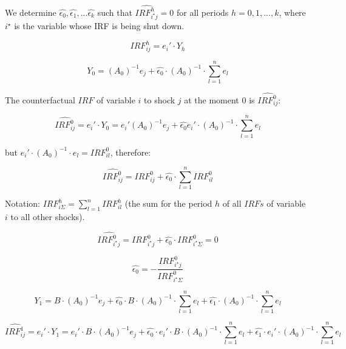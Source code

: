 \documentclass[11pt]{article}
\begin{document}
\begin{appendices}
We determine $\hat{\epsilon_0}, \hat{\epsilon_1}, ... \hat{\epsilon_k}$ such that $\hat{IRF^h_{i^\star j}} = 0$ for all periods $h=0,1,...,k$, where $i^\star$ is the variable whose IRF is being shut down.

\begin{equation}
IRF^h_{ij} = e_i' \cdot Y_h
\end{equation}

\begin{equation}
Y_{0}=(A_0)^{-1} e_j + \hat{\epsilon_0} \cdot (A_0)^{-1}\cdot \sum_{l=1}^n e_l
\end{equation}

The counterfactual $IRF$ of variable $i$ to shock $j$ at the moment 0 is $\hat{IRF^0_{ij}}$:

\begin{equation}
\hat{IRF^0_{ij}} = e_i' \cdot Y_{0}=  e_i' (A_0)^{-1} e_j + \hat{\epsilon_0} e_i' \cdot (A_0)^{-1}\cdot \sum_{l=1}^n e_l
\end{equation}

but $e_i' \cdot (A_0)^{-1}\cdot e_l = IRF^0_{il}$, therefore: 

\begin{equation}
\hat{IRF^0_{ij}} = IRF^0_{ij} + \hat{\epsilon_0} \cdot \sum_{l=1}^n IRF^0_{il}
\end{equation}

Notation: $IRF^h_{i\Sigma} = \sum_{l=1}^n IRF^h_{il} $ (the sum for the period $h$ of all $IRFs$ of variable $i$ to all other shocks).

\begin{equation}
\hat{IRF^0_{i^\star j}} = IRF^0_{i^\star j} + \hat{\epsilon_0} \cdot IRF^0_{i^\star \Sigma} = 0
\end{equation}

\begin{equation}
\hat{\epsilon_0}  = - \frac{IRF^0_{i^\star j}}{IRF^0_{i^\star \Sigma}}
\end{equation}

\begin{equation}
Y_{1}=B \cdot (A_0)^{-1} e_j + \hat{\epsilon_0} \cdot B\cdot (A_0)^{-1}\cdot \sum_{l=1}^n e_l + \hat{\epsilon_1} \cdot (A_0)^{-1}\cdot \sum_{l=1}^n e_l
\end{equation}

\begin{equation}
\hat{IRF^1_{ij}} = e_i' \cdot Y_{1} = e_i' \cdot B \cdot (A_0)^{-1} e_j + \hat{\epsilon_0} \cdot e_i' \cdot  B\cdot (A_0)^{-1}\cdot \sum_{l=1}^n e_l + \hat{\epsilon_1} \cdot e_i' \cdot (A_0)^{-1}\cdot \sum_{l=1}^n e_l
\end{equation}


\end{appendices}
\end{document}
